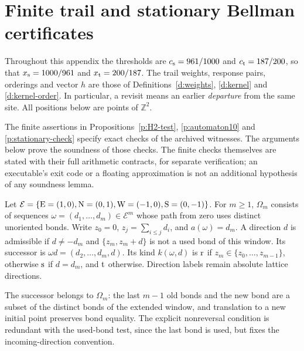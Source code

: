 
\section{Finite trail and stationary Bellman certificates}

Throughout this appendix the thresholds are
\(c_{\rm s}=961/1000\) and \(c_{\rm t}=187/200\), so that
\(x_{\rm s}=1000/961\) and \(x_{\rm t}=200/187\).
The trail weights, response pairs, orderings and vector \(h\) are
those of Definitions~\ref{d:weights}, \ref{d:kernel} and
\ref{d:kernel-order}. In particular, a revisit means an earlier
\emph{departure} from the same site. All positions below are points
of \(\mathbb Z^2\).

The finite assertions in Propositions~\ref{p:H2-test},
\ref{p:automaton10} and \ref{p:stationary-check} specify exact checks
of the archived witnesses. The arguments below prove the soundness
of those checks. The finite checks themselves are stated with their
full arithmetic contracts, for separate verification; an executable's
exit code or a floating approximation is not an additional hypothesis
of any soundness lemma.

\begin{definition}\label{d:memory-automaton}
Let \(\mathcal E=\{{\rm E}=(1,0),{\rm N}=(0,1),
{\rm W}=(-1,0),{\rm S}=(0,-1)\}\).
For \(m\ge1\), \(\Omega_m\) consists of sequences
\(\omega=(d_1,\ldots,d_m)\in\mathcal E^m\) whose path from zero
uses distinct unoriented bonds. Write \(z_0=0\),
\(z_j=\sum_{i\le j}d_i\), and \(a(\omega)=d_m\).
A direction \(d\) is admissible if \(d\ne-d_m\) and
\(\{z_m,z_m+d\}\) is not a used bond of this window.
Its successor is \(\omega d=(d_2,\ldots,d_m,d)\).
Its kind \(k(\omega,d)\) is \({\rm r}\) if
\(z_m\in\{z_0,\ldots,z_{m-1}\}\), otherwise \({\rm s}\)
if \(d=d_m\), and \({\rm t}\) otherwise.
Direction labels remain absolute lattice directions.
\end{definition}

The successor belongs to \(\Omega_m\): the last \(m-1\) old bonds
and the new bond are a subset of the distinct bonds of the extended
window, and translation to a new initial point preserves bond equality.
The explicit nonreversal condition is redundant with the used-bond
test, since the last bond is used, but fixes the incoming-direction
convention.

